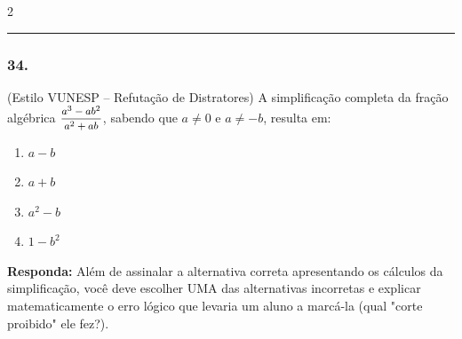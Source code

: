 \begin{multicols*}{2}
\par\vspace{\espacoQuestao}

\noindent\textcolor{CorLinha}{\rule{\linewidth}{0.5pt}} 
\par\vspace{\espacoPreQuestao}
\subsubsection*{34.} 
\begin{enunciadoLiteral}
(Estilo VUNESP -- Refutação de Distratores) A simplificação completa da fração algébrica $ \mfrac{a^3 - ab^2}{a^2 + ab} $, sabendo que $a \neq 0$ e $a \neq -b$, resulta em:

\begin{enumerate}[label=\alph*), itemsep=\espacoAlt]
    \item $a - b$
    \item $a + b$
    \item $a^2 - b$
    \item $1 - b^2$
\end{enumerate}

\begin{boxresponda}
\textbf{Responda:} Além de assinalar a alternativa correta apresentando os cálculos da simplificação, você deve escolher UMA das alternativas incorretas e explicar matematicamente o erro lógico que levaria um aluno a marcá-la (qual "corte proibido" ele fez?).
\end{boxresponda}
\end{enunciadoLiteral}


\end{multicols*}
